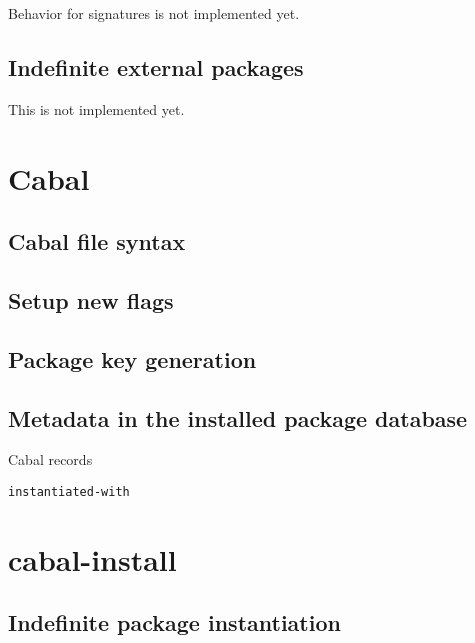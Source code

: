 \documentclass{article}
\newcommand{\Red}[1]{{\color{red} #1}}
\begin{document}
\Red{Behavior for signatures is not implemented yet.}

\subsection{Indefinite external packages}

\Red{This is not implemented yet.}

\section{Cabal}

\subsection{Cabal file syntax}

\subsection{Setup new flags}

\subsection{Package key generation}

\subsection{Metadata in the installed package database}

Cabal records

\texttt{instantiated-with}

\section{cabal-install}

\subsection{Indefinite package instantiation}
\end{document}
